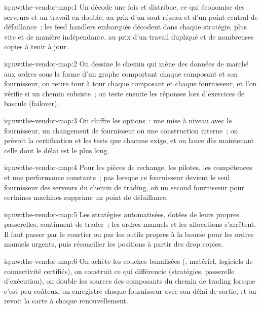 \begin{solution}{iq:nw:the-vendor-map:1}
Un  décode une fois et distribue, ce qui économise des serveurs et un travail en double, au prix d'un saut réseau et d'un point central
de défaillance~; les feed handlers embarqués décodent dans chaque stratégie, plus vite et de manière indépendante, au prix d'un travail dupliqué et de nombreuses copies à tenir
à jour.
\end{solution}

\begin{solution}{iq:nw:the-vendor-map:2}
On dessine le chemin qui mène des données de marché aux ordres sous la forme d'un graphe comportant chaque composant et son fournisseur, on retire tour à tour chaque composant et chaque fournisseur,
et l'on vérifie si un chemin subsiste~; on teste ensuite les réponses lors d'exercices de bascule (failover).
\end{solution}

\begin{solution}{iq:nw:the-vendor-map:3}
On chiffre les options~: une mise à niveau avec le fournisseur, un changement de fournisseur ou une construction interne~; on prévoit la certification et les tests que chacune exige, et
on lance dès maintenant celle dont le délai est le plus long.
\end{solution}

\begin{solution}{iq:nw:the-vendor-map:4}
Pour les pièces de rechange, les pilotes, les compétences et une performance constante~; pas lorsque ce fournisseur devient le seul fournisseur des serveurs du chemin de trading,
où un second fournisseur pour certaines machines supprime un point de défaillance.
\end{solution}

\begin{solution}{iq:nw:the-vendor-map:5}
Les stratégies automatisées, dotées de leurs propres passerelles, continuent de trader~; les ordres manuels et les allocations s'arrêtent. Il faut passer par le courtier ou par les outils propres
à la bourse pour les ordres manuels urgents, puis réconcilier les positions à partir des drop copies.
\end{solution}

\begin{solution}{iq:nw:the-vendor-map:6}
On achète les couches banalisées (, matériel, logiciels de connectivité certifiés), on construit ce qui différencie (stratégies, passerelle
d'exécution), on double les sources des composants du chemin de trading lorsque c'est peu coûteux, on enregistre chaque fournisseur avec son délai de sortie, et on revoit la carte
à chaque renouvellement.
\end{solution}
